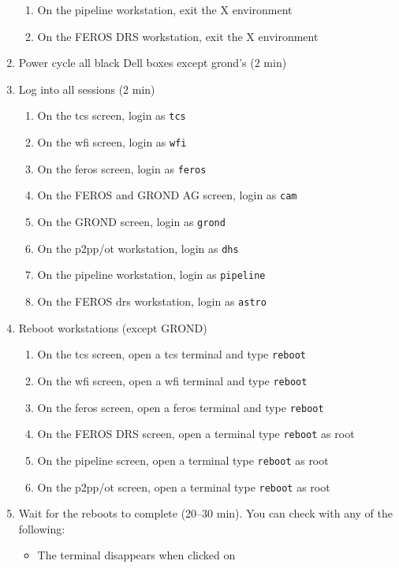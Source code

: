 \documentclass[11pt,fleqn]{book}
\begin{document}
\begin{enumerate}
\begin{enumerate}
        \item On the pipeline workstation, exit the X environment
        \item On the FEROS DRS workstation, exit the X environment
    \end{enumerate}
\item \label{list:soft:power}Power cycle all black Dell boxes except \gls{grond}'s (2 min) 
\item Log into all sessions (2 min)
\begin{enumerate}
    \item On the \gls{tcs} screen, login as \texttt{tcs}
    \item On the \gls{wfi} screen, login as \texttt{wfi}
    \item On the \gls{feros} screen, login as \texttt{feros}
    \item On the FEROS and GROND AG screen, login as \texttt{cam}
    \item On the GROND screen, login as \texttt{grond}
    \item On the \gls{p2pp}/\gls{ot} workstation, login as \texttt{dhs}
    \item On the pipeline workstation, login as \texttt{pipeline}
    \item On the FEROS \gls{drs} workstation, login as \texttt{astro}
\end{enumerate}
\item Reboot workstations (except GROND)
\begin{enumerate}
    \item On the \gls{tcs} screen, open a tcs terminal and type \texttt{reboot}
    \item On the \gls{wfi} screen, open a wfi terminal and type \texttt{reboot} 
    \item On the \gls{feros} screen, open a feros terminal and type \texttt{reboot}
    \item On the FEROS DRS screen, open a terminal type \texttt{reboot} as root
    \item On the pipeline screen, open a terminal type \texttt{reboot} as root
    \item On the p2pp/ot screen, open a terminal type \texttt{reboot} as root
\end{enumerate}
\item Wait for the reboots to complete (20--30 min). You can check with any of the following:
    \begin{itemize}
        \item The terminal disappears when clicked on

\end{itemize}
\end{enumerate}
\end{document}
